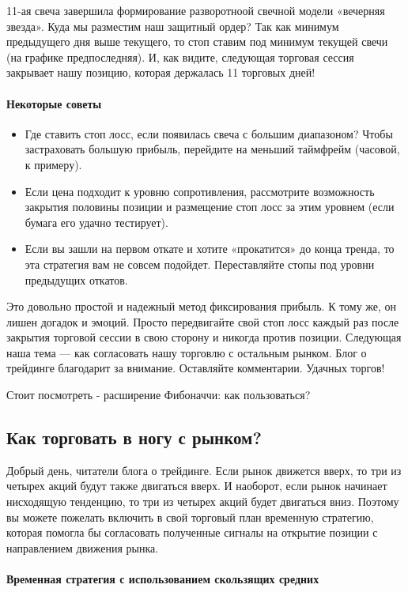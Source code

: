 \documentclass{book}
\begin{document}
11-ая свеча завершила формирование разворотноой свечной модели
«вечерняя звезда». Куда мы разместим наш защитный ордер? Так как
минимум предыдущего дня выше текущего, то стоп ставим под минимум
текущей свечи (на графике предпоследняя). И, как видите, следующая
торговая сессия закрывает нашу позицию, которая держалась 11 торговых
дней!

\paragraph{Некоторые советы}
\begin{itemize}
\item     Где ставить стоп лосс, если появилась свеча с большим диапазоном? Чтобы застраховать большую прибыль, перейдите на меньший таймфрейм (часовой, к примеру).
\item     Если цена подходит к уровню сопротивления, рассмотрите возможность закрытия половины позиции и размещение стоп лосс за этим уровнем (если бумага его удачно тестирует).
\item     Если вы зашли на первом откате и хотите «прокатится» до конца тренда, то эта стратегия вам не совсем подойдет. Переставляйте стопы под уровни предыдущих откатов.
\end{itemize}

Это довольно простой и надежный метод фиксирования прибыль. К тому же, он лишен догадок и эмоций. Просто передвигайте свой стоп лосс каждый раз после закрытия торговой сессии в свою сторону и никогда против позиции. Следующая наша тема — как согласовать нашу торговлю с остальным рынком. Блог о трейдинге благодарит за внимание. Оставляйте комментарии. Удачных торгов!


Стоит посмотреть - расширение Фибоначчи: как пользоваться?

\subsection{Как торговать в ногу с рынком?}

Добрый день, читатели блога о трейдинге. Если рынок движется вверх, то
три из четырех акций будут также двигаться вверх. И наоборот, если
рынок начинает нисходящую тенденцию, то три из четырех акций будет
двигаться вниз. Поэтому вы можете пожелать включить в свой торговый
план временную стратегию, которая помогла бы согласовать полученные
сигналы на открытие позиции с направлением движения рынка.

\paragraph{Временная стратегия с использованием скользящих средних}
\end{document}
